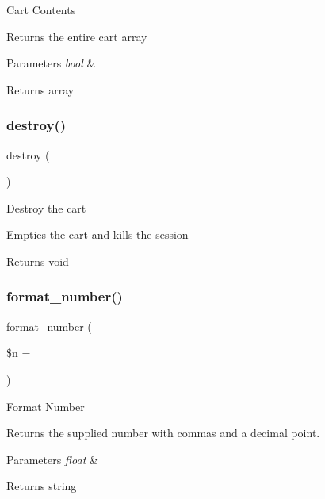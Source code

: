 Cart Contents

Returns the entire cart array


\begin{DoxyParams}{Parameters}
{\em bool} & \\
\hline
\end{DoxyParams}
\begin{DoxyReturn}{Returns}
array 
\end{DoxyReturn}
\mbox{\label{class_c_i___cart_aa118461de946085fe42989193337044a}} 
\subsubsection{\texorpdfstring{destroy()}{destroy()}}
{\footnotesize\ttfamily destroy (\begin{DoxyParamCaption}{ }\end{DoxyParamCaption})}

Destroy the cart

Empties the cart and kills the session

\begin{DoxyReturn}{Returns}
void 
\end{DoxyReturn}
\mbox{\label{class_c_i___cart_aea64eda9cf978b1e25c24458ca7e69df}} 
\subsubsection{\texorpdfstring{format\+\_\+number()}{format\_number()}}
{\footnotesize\ttfamily format\+\_\+number (\begin{DoxyParamCaption}\item[{}]{\$n = {\ttfamily \textquotesingle{}\textquotesingle{}} }\end{DoxyParamCaption})}

Format Number

Returns the supplied number with commas and a decimal point.


\begin{DoxyParams}{Parameters}
{\em float} & \\
\hline
\end{DoxyParams}
\begin{DoxyReturn}{Returns}
string 
\end{DoxyReturn}
\mbox{\label{class_c_i___cart_a73841dfae18a2719c7eb6d31978067a9}} 
